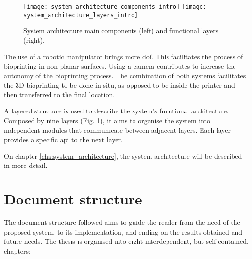 \begin{figure}[htbp]
	\centering
	\texttt{[image: system\_architecture\_components\_intro]}
	\hspace{0.1in}
	\texttt{[image: system\_architecture\_layers\_intro]}
	\caption{System architecture main components (left) and functional layers (right).}
	\label{fig:system_architecture_intro}
\end{figure}

The use of a robotic manipulator brings more \gls{dof}. This facilitates the process of bioprinting in non-planar surfaces. Using a camera contributes to increase the autonomy of the bioprinting process. The combination of both systems facilitates the 3D bioprinting to be done in situ, as opposed to be inside the printer and then transferred to the final location.

A layered structure is used to describe the system's functional architecture. Composed by nine layers (Fig. \ref{fig:system_architecture_intro}), it aims to organise the system into independent modules that communicate between adjacent layers. Each layer provides a specific \gls{api} to the next layer.

On chapter \ref{cha:system_architecture}, the system architecture will be described in more detail.


\section{Document structure}
\label{sec:document_structure}

The document structure followed aims to guide the reader from the need of the proposed system, to its implementation, and ending on the results obtained and future needs. The thesis is organised into eight interdependent, but self-contained, chapters:

